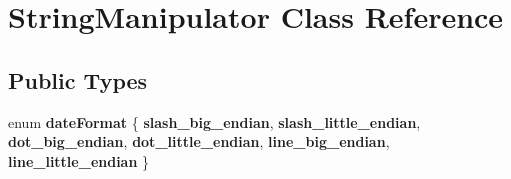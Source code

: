 \hypertarget{class_string_manipulator}{}\section{String\+Manipulator Class Reference}
\label{class_string_manipulator}
\subsection*{Public Types}
\begin{DoxyCompactItemize}
\item 
\mbox{\label{class_string_manipulator_a334eebb23cccec56948656326507617e}} 
enum {\bfseries date\+Format} \{ \newline
{\bfseries slash\+\_\+big\+\_\+endian}, 
{\bfseries slash\+\_\+little\+\_\+endian}, 
{\bfseries dot\+\_\+big\+\_\+endian}, 
{\bfseries dot\+\_\+little\+\_\+endian}, 
\newline
{\bfseries line\+\_\+big\+\_\+endian}, 
{\bfseries line\+\_\+little\+\_\+endian}
 \}
\end{DoxyCompactItemize}
